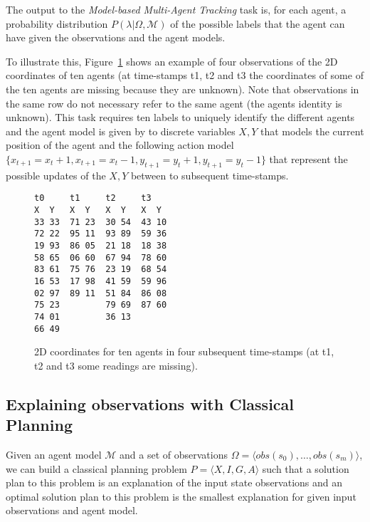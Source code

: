 \documentclass[letterpaper]{article} %
\newcommand{\tup}[1]{{\langle #1 \rangle}}
\begin{document}
The output to the {\em Model-based Multi-Agent Tracking} task is, for each agent, a probability distribution $P(\lambda|\Omega,\mathcal{M})$ of the possible labels that the agent can have given the observations and the agent models.

To illustrate this, Figure~\ref{fig:observation} shows an example of four observations of the 2D coordinates of ten agents (at time-stamps t1, t2 and t3 the coordinates of some of the ten agents are missing because they are unknown). Note that observations in the same row do not necessary refer to the same agent (the agents identity is unknown). This task requires ten labels to uniquely identify the different agents and the agent model is given by to discrete variables $X,Y$ that models the current position of the agent and the following action model $\{x_{t+1}=x_t + 1, x_{t+1}=x_t - 1, y_{t+1}=y_t + 1, y_{t+1}=y_t - 1\}$ that represent the possible updates of the $X,Y$ between to subsequent time-stamps.


\begin{figure}
\begin{scriptsize}
\begin{verbatim}
t0     t1     t2     t3
X  Y   X  Y   X  Y   X  Y
33 33  71 23  30 54  43 10
72 22  95 11  93 89  59 36
19 93  86 05  21 18  18 38
58 65  06 60  67 94  78 60
83 61  75 76  23 19  68 54
16 53  17 98  41 59  59 96
02 97  89 11  51 84  86 08
75 23         79 69  87 60
74 01         36 13
66 49
\end{verbatim}
\end{scriptsize}
 \caption{\small 2D coordinates for ten agents in four subsequent time-stamps (at t1, t2 and t3 some readings are missing).}
\label{fig:observation}
\end{figure}


\subsection{Explaining observations with Classical Planning}
Given an agent model $\mathcal{M}$ and a set of observations $\Omega=\tup{obs(s_0), \ldots, obs(s_m)}$, we can build a classical planning problem $P=\tup{X,I,G,A}$ such that a solution plan to this problem is an explanation of the input state observations and an optimal solution plan to this problem is the smallest explanation for given input observations and agent model.
\end{document}
